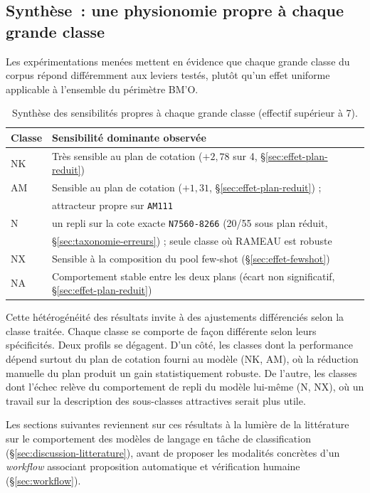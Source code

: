 \subsection*{Synthèse~: une physionomie propre à chaque grande classe}

Les expérimentations menées mettent en évidence que chaque grande classe du corpus répond différemment aux leviers testés, plutôt qu'un effet uniforme applicable à l'ensemble du périmètre BM'O.

\begin{table}[h]
\centering
\begin{tabular}{ll}
\toprule
\textbf{Classe} & \textbf{Sensibilité dominante observée} \\
\midrule
NK & Très sensible au plan de cotation ($+2{,}78$ sur 4, \S\ref{sec:effet-plan-reduit}) \\
AM & Sensible au plan de cotation ($+1{,}31$, \S\ref{sec:effet-plan-reduit}) ; \\
   & attracteur propre sur \texttt{AM111} \\
N  & un repli sur la cote exacte \texttt{N7560-8266} (20/55 sous plan réduit, \\
   & \S\ref{sec:taxonomie-erreurs}) ; seule classe où RAMEAU est robuste \\
NX & Sensible à la composition du pool few-shot (\S\ref{sec:effet-fewshot}) \\
NA & Comportement stable entre les deux plans (écart non significatif, \S\ref{sec:effet-plan-reduit}) \\
\bottomrule
\end{tabular}
\caption{Synthèse des sensibilités propres à chaque grande classe
(effectif supérieur à 7).}
\label{tab:synthese-classes}
\end{table}

Cette hétérogénéité des résultats invite à des ajustements différenciés selon la classe traitée. Chaque classe se comporte de façon différente selon leurs spécificités. Deux profils se dégagent. D'un côté, les classes dont la performance dépend surtout du plan de cotation fourni au modèle (NK, AM), où la réduction manuelle du plan produit un gain statistiquement robuste. De l'autre, les classes dont l'échec relève  du comportement de repli du modèle lui-même (N, NX), où un travail sur la description des sous-classes attractives serait plus utile.

Les sections suivantes reviennent sur ces résultats à la lumière de la littérature sur le comportement des modèles de langage en tâche de classification (\S\ref{sec:discussion-litterature}), avant de proposer les modalités concrètes d'un \textit{workflow} associant proposition automatique et vérification humaine (\S\ref{sec:workflow}).








